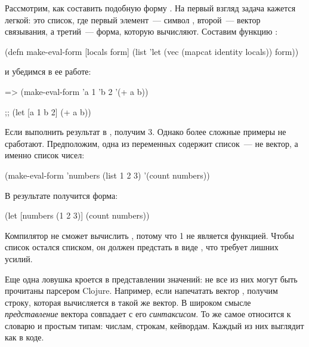Рассмотрим, как составить подобную форму . На первый взгляд задача кажется легкой: это список, где первый элемент~--- символ , второй~--- вектор связывания, а третий~--- форма, которую вычисляют. Составим функцию :

\begin{english}
  \begin{clojure}
(defn make-eval-form
  [locals form]
  (list 'let (vec (mapcat identity locals)) form))
  \end{clojure}
\end{english}

\noindent
и убедимся в ее работе:

\begin{english}
  \begin{clojure}
=> (make-eval-form {'a 1 'b 2} '(+ a b))

;; (let [a 1 b 2] (+ a b))
  \end{clojure}
\end{english}

Если выполнить результат в , получим 3. Однако более сложные примеры не сработают. Предположим, одна из переменных содержит список~--- не вектор, а именно список чисел:

\begin{english}
  \begin{clojure}
(make-eval-form {'numbers (list 1 2 3)}
                '(count numbers))
  \end{clojure}
\end{english}

\pagebreaklarge

В результате получится форма:

\begin{english}
  \begin{clojure}
(let [numbers (1 2 3)]
  (count numbers))
  \end{clojure}
\end{english}

Компилятор не сможет вычислить , потому что 1 не является функцией. Чтобы список остался списком, он должен предстать в виде , что требует лишних усилий.

Еще одна ловушка кроется в представлении значений: не все из них могут быть прочитаны парсером Clojure. Например, если напечатать вектор \code{[1 2 3]}, получим строку, которая вычисляется в такой же вектор. В широком смысле \emph{представление} вектора совпадает с его \emph{синтаксисом}. То же самое относится к словарю и простым типам: числам, строкам, кейвордам. Каждый из них выглядит как в коде.

